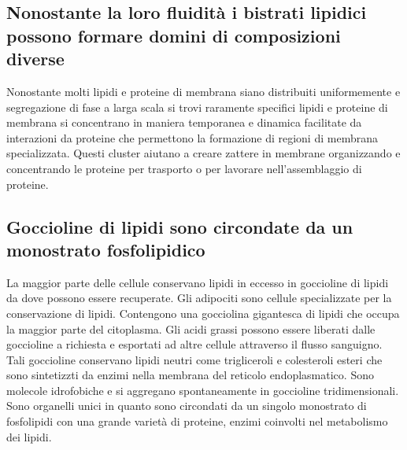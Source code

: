 \subsection{Nonostante la loro fluidit\`a i bistrati lipidici possono formare domini di composizioni diverse}
Nonostante molti lipidi e proteine di membrana siano distribuiti uniformemente e segregazione di fase a larga scala si trovi raramente specifici lipidi e proteine di membrana si 
concentrano in maniera temporanea e dinamica facilitate da interazioni da proteine che permettono la formazione di regioni di membrana specializzata. Questi cluster aiutano a creare
zattere in membrane organizzando e concentrando le proteine per trasporto o per lavorare nell'assemblaggio di proteine.
\subsection{Goccioline di lipidi sono circondate da un monostrato fosfolipidico}
La maggior parte delle cellule conservano lipidi in eccesso in goccioline di lipidi da dove possono essere recuperate. Gli adipociti sono cellule specializzate per la conservazione
di lipidi. Contengono una gocciolina gigantesca di lipidi che occupa la maggior parte del citoplasma. Gli acidi grassi possono essere liberati dalle goccioline a richiesta e esportati
ad altre cellule attraverso il flusso sanguigno. Tali goccioline conservano lipidi neutri come trigliceroli e colesteroli esteri che sono sintetizzti da enzimi nella membrana del
reticolo endoplasmatico. Sono molecole idrofobiche e si aggregano spontaneamente in goccioline tridimensionali. Sono organelli unici in quanto sono circondati da un singolo monostrato di
fosfolipidi con una grande variet\`a di proteine, enzimi coinvolti nel metabolismo dei lipidi. 
